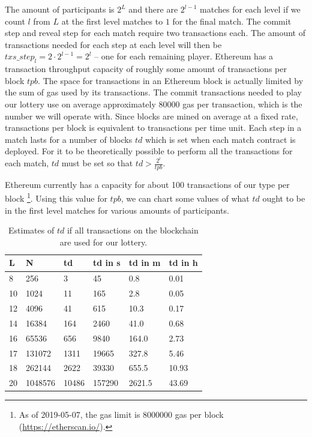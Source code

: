 The amount of participants is $2^L$ and there are $2^{l-1}$ matches for each level if we count $l$ from $L$ at the first level matches to $1$ for the final match. The commit step and reveal step for each match require two transactions each. The amount of transactions needed for each step at each level will then be $txs\_step_{l}=2 \cdot 2^{l-1}=2^l$ – one for each remaining player. Ethereum has a transaction throughput capacity of roughly some amount of transactions per block $tpb$. The space for transactions in an Ethereum block is actually limited by the sum of gas used by its transactions. The commit transactions needed to play our lottery use on average approximately 80000 gas per transaction, which is the number we will operate with. Since blocks are mined on average at a fixed rate, transactions per block is equivalent to transactions per time unit.
Each step in a match lasts for a number of blocks $td$ which is set when each match contract is deployed. For it to be theoretically possible to perform all the transactions for each match, $td$ must be set so that $td > \frac{2^{l}}{tpb}$.

Ethereum currently has a capacity for about 100 transactions of our type per block \footnote{As of 2019-05-07, the gas limit is 8000000 gas per block (\url{https://etherscan.io/}).}. Using this value for $tpb$, we can chart some values of what $td$ ought to be in the first level matches for various amounts of participants.

\begin{table}[h]
\centering
\caption{Estimates of $td$ if all transactions on the blockchain are used for our lottery.}
\label{tab:td-100percent-transactions}
\begin{tabular}{|l|l|l|l|l|l|}
\hline

L & N & td & td in s & td in m & td in h \\ \hline
8 & 256 & 3 & 45 & 0.8 & 0.01 \\ \hline
10 & 1024 & 11 & 165 & 2.8 & 0.05 \\ \hline
12 & 4096 & 41 & 615 & 10.3 & 0.17 \\ \hline
14 & 16384 & 164 & 2460 & 41.0 & 0.68 \\ \hline
16 & 65536 & 656 & 9840 & 164.0 & 2.73 \\ \hline
17 & 131072 & 1311 & 19665 & 327.8 & 5.46 \\ \hline
18 & 262144 & 2622 & 39330 & 655.5 & 10.93 \\ \hline
20 & 1048576 & 10486 & 157290 & 2621.5 & 43.69 \\ \hline

\end{tabular}
\end{table}

